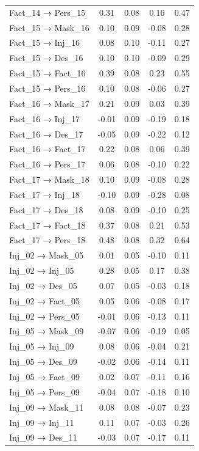 \documentclass[
  man, donotrepeattitle,floatsintext]{apa6}
\begin{document}
\begin{center}
\begin{ThreePartTable}
{\begin{longtable}{lcccc}
Fact\_14 → Pers\_15 & 0.31 & 0.08 & 0.16 & 0.47\\
Fact\_15 → Mask\_16 & 0.10 & 0.09 & -0.08 & 0.28\\
Fact\_15 → Inj\_16 & 0.08 & 0.10 & -0.11 & 0.27\\
Fact\_15 → Des\_16 & 0.10 & 0.10 & -0.09 & 0.29\\
Fact\_15 → Fact\_16 & 0.39 & 0.08 & 0.23 & 0.55\\
Fact\_15 → Pers\_16 & 0.10 & 0.08 & -0.06 & 0.27\\
Fact\_16 → Mask\_17 & 0.21 & 0.09 & 0.03 & 0.39\\
Fact\_16 → Inj\_17 & -0.01 & 0.09 & -0.19 & 0.18\\
Fact\_16 → Des\_17 & -0.05 & 0.09 & -0.22 & 0.12\\
Fact\_16 → Fact\_17 & 0.22 & 0.08 & 0.06 & 0.39\\
Fact\_16 → Pers\_17 & 0.06 & 0.08 & -0.10 & 0.22\\
Fact\_17 → Mask\_18 & 0.10 & 0.09 & -0.08 & 0.28\\
Fact\_17 → Inj\_18 & -0.10 & 0.09 & -0.28 & 0.08\\
Fact\_17 → Des\_18 & 0.08 & 0.09 & -0.10 & 0.25\\
Fact\_17 → Fact\_18 & 0.37 & 0.08 & 0.21 & 0.53\\
Fact\_17 → Pers\_18 & 0.48 & 0.08 & 0.32 & 0.64\\
Inj\_02 → Mask\_05 & 0.01 & 0.05 & -0.10 & 0.11\\
Inj\_02 → Inj\_05 & 0.28 & 0.05 & 0.17 & 0.38\\
Inj\_02 → Des\_05 & 0.07 & 0.05 & -0.03 & 0.18\\
Inj\_02 → Fact\_05 & 0.05 & 0.06 & -0.08 & 0.17\\
Inj\_02 → Pers\_05 & -0.01 & 0.06 & -0.13 & 0.11\\
Inj\_05 → Mask\_09 & -0.07 & 0.06 & -0.19 & 0.05\\
Inj\_05 → Inj\_09 & 0.08 & 0.06 & -0.04 & 0.21\\
Inj\_05 → Des\_09 & -0.02 & 0.06 & -0.14 & 0.11\\
Inj\_05 → Fact\_09 & 0.02 & 0.07 & -0.11 & 0.16\\
Inj\_05 → Pers\_09 & -0.04 & 0.07 & -0.18 & 0.10\\
Inj\_09 → Mask\_11 & 0.08 & 0.08 & -0.07 & 0.23\\
Inj\_09 → Inj\_11 & 0.11 & 0.07 & -0.03 & 0.26\\
Inj\_09 → Des\_11 & -0.03 & 0.07 & -0.17 & 0.11\\

\end{longtable}}
\end{ThreePartTable}
\end{center}
\end{document}

